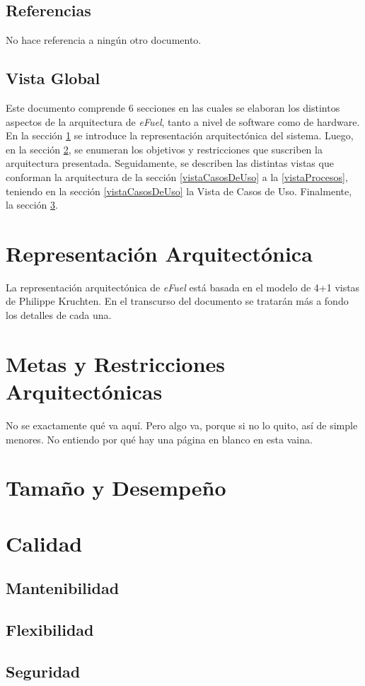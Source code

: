 \documentclass{article}
\begin{document}
    \subsection{Referencias}
    No hace referencia a ningún otro documento.

    \subsection{Vista Global}
    Este documento comprende 6 secciones en las cuales se elaboran los distintos aspectos de la arquitectura de \emph{eFuel}, tanto a nivel de software como de hardware. En la sección \ref{reprArq} se introduce la representación arquitectónica del sistema. Luego, en la sección \ref{metasArq}, se enumeran los objetivos y restricciones que suscriben la arquitectura presentada. Seguidamente, se describen las distintas vistas que conforman la arquitectura de la sección \ref{vistaCasosDeUso} a la \ref{vistaProcesos}, teniendo en la sección \ref{vistaCasosDeUso} la Vista de Casos de Uso. Finalmente, la sección \ref{tamDesemp}.


    \section{Representación Arquitectónica} \label{reprArq}
    La representación arquitectónica de \emph{eFuel} está basada en el modelo de 4+1 vistas de Philippe Kruchten. En el transcurso del documento se tratarán más a fondo los detalles de cada una.

    \section{Metas y Restricciones Arquitectónicas} \label{metasArq}
    No se exactamente qué va aquí. Pero algo va, porque si no lo quito, así de simple menores. No entiendo por qué hay una página en blanco en esta vaina.

    
    
    
    
    

    \section{Tamaño y Desempeño} \label{tamDesemp}

    \section{Calidad}
    \subsection{Mantenibilidad}
    \subsection{Flexibilidad}
    \subsection{Seguridad}
\end{document}
